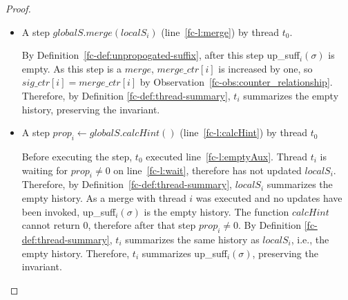 \begin{proof}
\begin{itemize}
        \item A step $globalS.merge(localS_i)$ (line~\ref{fc-l:merge}) by thread $t_0$.
        
        By Definition~\ref{fc-def:unpropogated-suffix}, after this step up\_suff$_i(\sigma)$ is empty. As
        this step is a $merge$, $merge\_ctr[i]$ is increased by one, so $sig\_ctr[i]=merge\_ctr[i]$ by
        Observation~\ref{fc-obs:counter_relationship}.
        Therefore, by Definition \ref{fc-def:thread-summary}, $t_i$
        summarizes the empty history, preserving the invariant.

        \item A step $prop_i \leftarrow globalS.calcHint()$ (line~\ref{fc-l:calcHint}) by thread $t_0$
        
        Before executing the step, $t_0$ executed line~\ref{fc-l:emptyAux}. Thread $t_i$ is waiting
        for $prop_i \neq 0$ on line~\ref{fc-l:wait}, therefore has not updated $localS_i$.
        Therefore, by Definition~\ref{fc-def:thread-summary}, $localS_i$ summarizes the empty history.
        As a merge with thread $i$ was executed and no updates have been invoked, up\_suff$_i(\sigma)$
        is the empty history.
        The function $calcHint$ cannot return $0$, therefore after that step $prop_i \neq 0$.
        By Definition \ref{fc-def:thread-summary}, $t_i$ summarizes the same history as $localS_i$, i.e., the empty history.
        Therefore, $t_i$ summarizes up\_suff$_i(\sigma)$, preserving the invariant.
    \end{itemize}
\end{proof}

